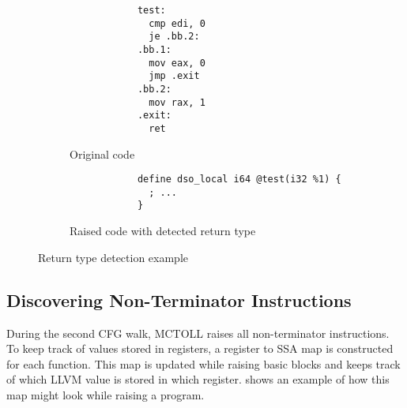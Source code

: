 \begin{figure}[htpb]
    \centering
    \begin{subfigure}[t]{.45\textwidth}
        \begin{lstlisting}
            test:
              cmp edi, 0
              je .bb.2:
            .bb.1:
              mov eax, 0
              jmp .exit
            .bb.2:
              mov rax, 1
            .exit:
              ret
        \end{lstlisting}
        \caption{Original code}
    \end{subfigure}
    \begin{subfigure}[t]{.45\textwidth}
        \begin{lstlisting}
            define dso_local i64 @test(i32 %1) {
              ; ...
            }
        \end{lstlisting}
        \caption{Raised code with detected return type}
    \end{subfigure}
    \caption{Return type detection example}
    \label{fig:return-type-detection}
\end{figure}

\subsection{Discovering Non-Terminator Instructions}\label{subsec:discovering-non-terminator-instructions}

During the second CFG walk, MCTOLL raises all non-terminator instructions.
To keep track of values stored in registers, a register to \gls{SSA} map is constructed for each function.
This map is updated while raising basic blocks and keeps track of which LLVM value is stored in which register.
 shows an example of how this map might look while raising a program.

